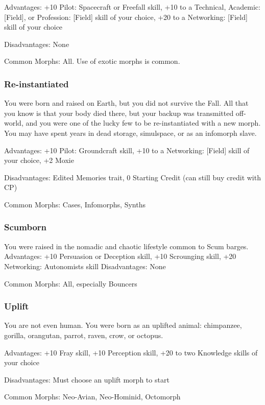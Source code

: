 Advantages: +10 Pilot: Spacecraft or Freefall skill, +10 to a Technical, Academic: [Field], or Profession: [Field] skill of your choice, +20 to a Networking: [Field] skill of your choice 

Disadvantages: None 

Common Morphs: All. Use of exotic morphs is common. 

\subsubsection{Re-instantiated} \label{sec:re-instantiated} 

You were born and raised on Earth, but you did not survive the Fall. All that you know is that your body died there, but your backup was transmitted off-world, and you were one of the lucky few to be re-instantiated with a new morph. You may have spent years in dead storage, simulspace, or as an infomorph slave. 

Advantages: +10 Pilot: Groundcraft skill, +10 to a Networking: [Field] skill of your choice, +2 Moxie 

Disadvantages: Edited Memories trait, 0 Starting Credit (can still buy credit with CP) 

Common Morphs: Cases, Infomorphs, Synths 

\subsubsection{Scumborn} \label{sec:scumborn} 

You were raised in the nomadic and chaotic lifestyle common to Scum barges. Advantages: +10 Persuasion or Deception skill, +10 Scrounging skill, +20 Networking: Autonomists skill Disadvantages: None 

Common Morphs: All, especially Bouncers 

\subsubsection{Uplift} \label{sec:uplift} 

You are not even human. You were born as an uplifted animal: chimpanzee, gorilla, orangutan, parrot, raven, crow, or octopus. 

Advantages: +10 Fray skill, +10 Perception skill, +20 to two Knowledge skills of your choice 

Disadvantages: Must choose an uplift morph to start 

Common Morphs: Neo-Avian, Neo-Hominid, Octomorph 

